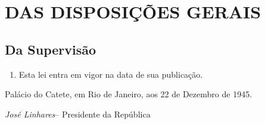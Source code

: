 \documentclass[a4paper,12pt]{report}
\newcommand{\DataAssinatura}{22 de Dezembro de 1945}
\newcommand{\LocalAssinatura}{Palácio do Catete}
\newcommand{\CidadeAssinatura}{Rio de Janeiro}
\newcommand{\Signatario}{\textit{José Linhares}}
\newcommand{\CargoSignatario}{Presidente da República}
\begin{document}
\chapter{DAS DISPOSIÇÕES GERAIS}

\section{Da Supervisão}

\begin{enumerate}[resume, label=Art. \arabic*]

\item Esta lei entra em vigor na data de sua publicação.

\end{enumerate}

\LocalAssinatura, em \CidadeAssinatura, aos \DataAssinatura.

\Signatario – \CargoSignatario

\end{document}
